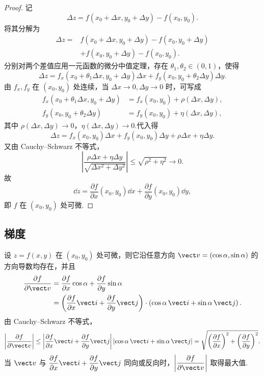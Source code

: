\begin{proof}
	记
	\[
	\Delta z=f(x_0+\Delta x,y_0+\Delta y)-f(x_0,y_0).
	\]
	将其分解为
	\[
	\begin{aligned}
	\Delta z
	={}&f(x_0+\Delta x,y_0+\Delta y)-f(x_0,y_0+\Delta y)\\
	&+f(x_0,y_0+\Delta y)-f(x_0,y_0).
	\end{aligned}
	\]
	分别对两个差值应用一元函数的微分中值定理，存在
	$\theta_1,\theta_2\in(0,1)$，使得
	\[
	\Delta z
	=
	f_x(x_0+\theta_1\Delta x,y_0+\Delta y)\Delta x
	+
	f_y(x_0,y_0+\theta_2\Delta y)\Delta y.
	\]
	由 $f_x,f_y$ 在 $(x_0,y_0)$ 处连续，当
	$\Delta x\to0,\Delta y\to0$ 时，可写成
	\[
	\begin{aligned}
	f_x(x_0+\theta_1\Delta x,y_0+\Delta y)
		&=f_x(x_0,y_0)+\rho(\Delta x,\Delta y),\\
	f_y(x_0,y_0+\theta_2\Delta y)
		&=f_y(x_0,y_0)+\eta(\Delta x,\Delta y),
	\end{aligned}
	\]
	其中 $\rho(\Delta x,\Delta y)\to0$，$\eta(\Delta x,\Delta y)\to0$.代入得
	\[
	\Delta z
	=
	f_x(x_0,y_0)\Delta x+f_y(x_0,y_0)\Delta y
	+\rho\Delta x+\eta\Delta y.
	\]
	又由 Cauchy--Schwarz 不等式，
	\[
	\left|
	\frac{\rho\Delta x+\eta\Delta y}
	{\sqrt{\Delta x^2+\Delta y^2}}
	\right|
	\leq
	\sqrt{\rho^2+\eta^2}\longrightarrow0.
	\]
	故
	\[
	\dd z
	=
	\frac{\partial f}{\partial x}(x_0,y_0)\dd x
	+
	\frac{\partial f}{\partial y}(x_0,y_0)\dd y,
	\]
	即 $f$ 在 $(x_0,y_0)$ 处可微.
\end{proof}

\subsection*{梯度}

设 $z=f(x,y)$ 在 $(x_0,y_0)$ 处可微，则它沿任意方向
$\vect v=(\cos\alpha,\sin\alpha)$ 的方向导数均存在，并且
\[
\begin{aligned}
\frac{\partial f}{\partial\vect v}
&=
\frac{\partial f}{\partial x}\cos\alpha
+
\frac{\partial f}{\partial y}\sin\alpha\\
&=
\left(
\frac{\partial f}{\partial x}\vect i
+
\frac{\partial f}{\partial y}\vect j
\right)
\cdot
\left(\cos\alpha\,\vect i+\sin\alpha\,\vect j\right).
\end{aligned}
\]
由 Cauchy--Schwarz 不等式，
\[
\left|
\frac{\partial f}{\partial\vect v}
\right|
\leq
\left|
\frac{\partial f}{\partial x}\vect i
+
\frac{\partial f}{\partial y}\vect j
\right|
\left|\cos\alpha\,\vect i+\sin\alpha\,\vect j\right|
=
\sqrt{
\left(\frac{\partial f}{\partial x}\right)^2
+
\left(\frac{\partial f}{\partial y}\right)^2
}.
\]
当 $\vect v$ 与
$\dfrac{\partial f}{\partial x}\vect i+
\dfrac{\partial f}{\partial y}\vect j$
同向或反向时，$\left|\dfrac{\partial f}{\partial\vect v}\right|$ 取得最大值.

